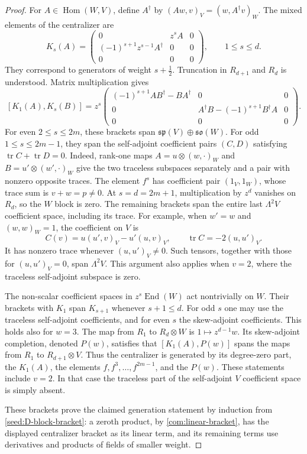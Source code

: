 \documentclass[11pt,a4paper]{amsart}
\numberwithin{equation}{section}
\theoremstyle{definition}
\theoremstyle{remark}
\begin{document}
\begin{proof}
For $A\in\operatorname{Hom}(W,V)$, define $A^\dagger$ by
$(Aw,v)_V=(w,A^\dagger v)_W$. The mixed elements of the centralizer are
$$
 K_s(A)=
 \begin{pmatrix}
 0&z^sA&0\\
 (-1)^{s+1}z^{s-1}A^\dagger&0&0\\
 0&0&0
 \end{pmatrix},\qquad 1\leq s\leq d.
$$
They correspond to generators of weight $s+\frac12$. Truncation in
$R_{d+1}$ and $R_d$ is understood. Matrix multiplication gives
\begin{equation}\label{seed:D-block-bracket}
 [K_1(A),K_s(B)]
 =z^s\begin{pmatrix}
 (-1)^{s+1}AB^\dagger-BA^\dagger&0&0\\
 0&A^\dagger B-(-1)^{s+1}B^\dagger A&0\\
 0&0&0
 \end{pmatrix}.
\end{equation}
For even $2\le s\le2m$, these brackets span
$\mathfrak{sp}(V)\oplus\mathfrak{so}(W)$.
For odd $1\le s\le2m-1$, they span the self-adjoint coefficient
pairs $(C,D)$ satisfying $\operatorname{tr}C+\operatorname{tr}D=0$.
Indeed, rank-one maps $A=u\otimes(w,\cdot)_W$ and
$B=u'\otimes(w',\cdot)_W$ give the two traceless subspaces
separately and a pair with nonzero opposite traces. The element
$f^s$ has coefficient pair $(1_V,1_W)$, whose trace sum is
$v+w=p\ne0$.
At $s=d=2m+1$, multiplication by $z^d$ vanishes on $R_d$,
so the $W$ block is zero. The remaining brackets span the entire
last $\Lambda^2V$ coefficient space, including its trace.
For example, when $w'=w$ and $(w,w)_W=1$, the coefficient on $V$ is
$$
 C(v)=u(u',v)_V-u'(u,v)_V,
 \qquad \operatorname{tr}C=-2(u,u')_V.
$$
It has nonzero trace whenever $(u,u')_V\ne0$. Such tensors,
together with those for $(u,u')_V=0$, span $\Lambda^2V$.
This argument also applies when $v=2$, where the traceless
self-adjoint subspace is zero.

The non-scalar coefficient spaces in $z^s\operatorname{End}(W)$ act
nontrivially on $W$. Their brackets with $K_1$ span $K_{s+1}$ whenever
$s+1\leq d$. For odd $s$ one may use the traceless self-adjoint
coefficients, and for even $s$ the skew-adjoint coefficients. This
holds also for $w=3$. The map from $R_1$ to $R_d\otimes W$ is
$1\mapsto z^{d-1}w$. Its skew-adjoint completion, denoted $P(w)$,
satisfies that $[K_1(A),P(w)]$ spans the maps from $R_1$ to
$R_{d+1}\otimes V$. Thus the centralizer is generated by its degree-zero
part, the $K_1(A)$, the elements $f,f^3,\ldots,f^{2m-1}$, and the
$P(w)$. These statements include $v=2$. In that case the traceless
part of the self-adjoint $V$ coefficient space is simply absent.

These brackets prove the claimed generation statement by induction from \eqref{seed:D-block-bracket}: a zeroth product, by \cref{com:linear-bracket},
has the displayed centralizer bracket as its linear term, and its
remaining terms use derivatives and products of fields of smaller
weight.

\end{proof}
\end{document}

